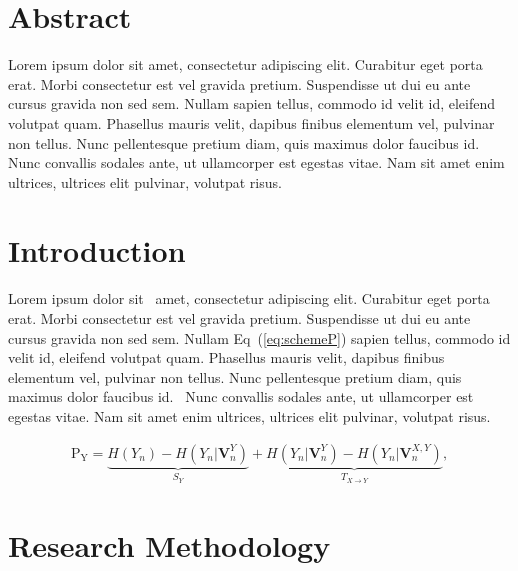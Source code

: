 \documentclass[10pt,letterpaper]{article}
\begin{document}
\section*{Abstract}
Lorem ipsum dolor sit amet, consectetur adipiscing elit. Curabitur eget porta erat. Morbi consectetur est vel gravida pretium. Suspendisse ut dui eu ante cursus gravida non sed sem. Nullam sapien tellus, commodo id velit id, eleifend volutpat quam. Phasellus mauris velit, dapibus finibus elementum vel, pulvinar non tellus. Nunc pellentesque pretium diam, quis maximus dolor faucibus id. Nunc convallis sodales ante, ut ullamcorper est egestas vitae. Nam sit amet enim ultrices, ultrices elit pulvinar, volutpat risus.



\section*{Introduction}
Lorem ipsum dolor sit~\cite{bib1} amet, consectetur adipiscing elit. Curabitur eget porta erat. Morbi consectetur est vel gravida pretium. Suspendisse ut dui eu ante cursus gravida non sed sem. Nullam Eq~(\ref{eq:schemeP}) sapien tellus, commodo id velit id, eleifend volutpat quam. Phasellus mauris velit, dapibus finibus elementum vel, pulvinar non tellus. Nunc pellentesque pretium diam, quis maximus dolor faucibus id.~\cite{bib2} Nunc convallis sodales ante, ut ullamcorper est egestas vitae. Nam sit amet enim ultrices, ultrices elit pulvinar, volutpat risus.

\begin{eqnarray}
\label{eq:XGBoost}
	\mathrm{P_Y} = \underbrace{H(Y_n) - H(Y_n|\mathbf{V}^{Y}_{n})}_{S_Y} + \underbrace{H(Y_n|\mathbf{V}^{Y}_{n})- H(Y_n|\mathbf{V}^{X,Y}_{n})}_{T_{X\rightarrow Y}},
\end{eqnarray}

\section*{Research Methodology}
\end{document}
